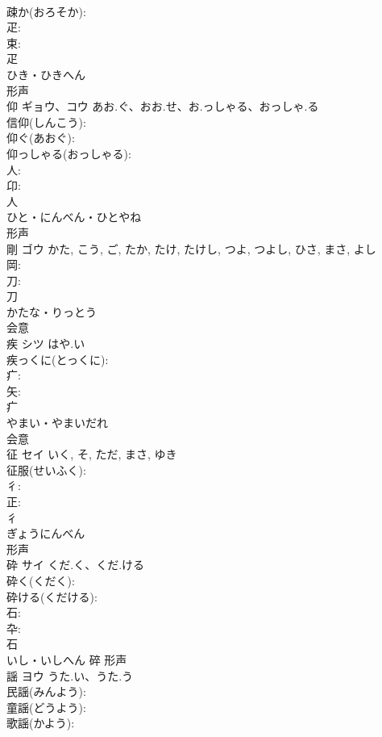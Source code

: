 \documentclass[8pt]{extreport}
\begin{document}
\begin{CJK}{UTF8}{min}
\\	疎か(おろそか): 
\\	疋: 
\\	束: 
\\	疋	
\\	ひき・ひきへん	
\\	形声 
\\	仰	ギョウ、コウ	あお.ぐ、おお.せ、お.っしゃる、おっしゃ.る		
\\	信仰(しんこう): 
\\	仰ぐ(あおぐ): 
\\	仰っしゃる(おっしゃる): 
\\	人: 
\\	卬: 
\\	人	
\\	ひと・にんべん・ひとやね	
\\	形声 
\\	剛	ゴウ		かた, こう, ご, たか, たけ, たけし, つよ, つよし, ひさ, まさ, よし	
\\	岡: 
\\	刀: 
\\	刀	
\\	かたな・りっとう	
\\	会意 
\\	疾	シツ	はや.い		
\\	疾っくに(とっくに): 
\\	疒: 
\\	矢: 
\\	疒	
\\	やまい・やまいだれ	
\\	会意 
\\	征	セイ		いく, そ, ただ, まさ, ゆき	
\\	征服(せいふく): 
\\	彳: 
\\	正: 
\\	彳	
\\	ぎょうにんべん	
\\	形声 
\\	砕	サイ	くだ.く、くだ.ける		
\\	砕く(くだく): 
\\	砕ける(くだける): 
\\	石: 
\\	卆: 
\\	石	
\\	いし・いしへん	碎	形声 
\\	謡	ヨウ	うた.い、うた.う		
\\	民謡(みんよう): 
\\	童謡(どうよう): 
\\	歌謡(かよう): 

\end{CJK}
\end{document}
